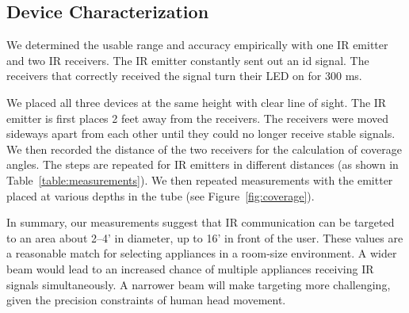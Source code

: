 \subsection{Device Characterization}
We determined the usable range and accuracy empirically with one IR emitter and two IR receivers. The IR emitter constantly sent out an id signal. The receivers that correctly received the signal turn their LED on for 300 ms.

We placed all three devices at the same height with clear line of sight. The IR emitter is first places 2 feet away from the receivers. The receivers were moved sideways apart from each other until they could no longer receive stable signals. We then recorded the distance of the two receivers for the calculation of coverage angles. The steps are repeated for IR emitters in different distances (as shown in Table~\ref{table:measurements}). We then repeated measurements with the emitter  placed at various depths in the tube (see Figure~\ref{fig:coverage}). 

In summary, our measurements suggest that IR communication can be targeted to an area about 2--4' in diameter, up to 16' in front of the user. These values are a reasonable match for selecting appliances in a room-size environment. A wider beam would lead to an increased chance of multiple appliances receiving IR signals simultaneously. A narrower beam will make targeting more challenging, given the precision constraints of human head movement.

